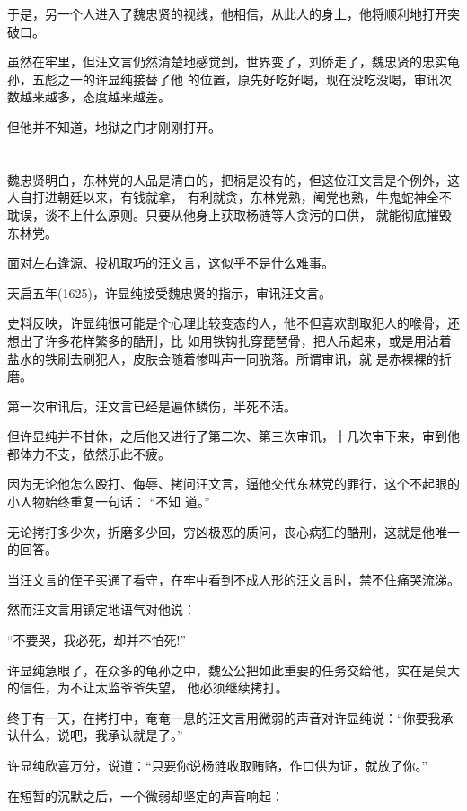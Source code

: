 \documentclass[11pt,a4paper,onecolumn]{article}
\begin{document}
于是，另一个人进入了魏忠贤的视线，他相信，从此人的身上，他将顺利地打开突破口。

虽然在牢里，但汪文言仍然清楚地感觉到，世界变了，刘侨走了，魏忠贤的忠实龟孙，五彪之一的许显纯接替了他
的位置，原先好吃好喝，现在没吃没喝，审讯次数越来越多，态度越来越差。

但他并不知道，地狱之门才刚刚打开。

\section[\thesection]{}

魏忠贤明白，东林党的人品是清白的，把柄是没有的，但这位汪文言是个例外，这人自打进朝廷以来，有钱就拿，
有利就贪，东林党熟，阉党也熟，牛鬼蛇神全不耽误，谈不上什么原则。只要从他身上获取杨涟等人贪污的口供，
就能彻底摧毁东林党。

面对左右逢源、投机取巧的汪文言，这似乎不是什么难事。

天启五年(1625)，许显纯接受魏忠贤的指示，审讯汪文言。

史料反映，许显纯很可能是个心理比较变态的人，他不但喜欢割取犯人的喉骨，还想出了许多花样繁多的酷刑，比
如用铁钩扎穿琵琶骨，把人吊起来，或是用沾着盐水的铁刷去刷犯人，皮肤会随着惨叫声一同脱落。所谓审讯，就
是赤裸裸的折磨。

第一次审讯后，汪文言已经是遍体鳞伤，半死不活。

但许显纯并不甘休，之后他又进行了第二次、第三次审讯，十几次审下来，审到他都体力不支，依然乐此不疲。

因为无论他怎么殴打、侮辱、拷问汪文言，逼他交代东林党的罪行，这个不起眼的小人物始终重复一句话： ``不知
道。''

无论拷打多少次，折磨多少回，穷凶极恶的质问，丧心病狂的酷刑，这就是他唯一的回答。

当汪文言的侄子买通了看守，在牢中看到不成人形的汪文言时，禁不住痛哭流涕。

然而汪文言用镇定地语气对他说：

``不要哭，我必死，却并不怕死!''

许显纯急眼了，在众多的龟孙之中，魏公公把如此重要的任务交给他，实在是莫大的信任，为不让太监爷爷失望，
他必须继续拷打。

终于有一天，在拷打中，奄奄一息的汪文言用微弱的声音对许显纯说：``你要我承认什么，说吧，我承认就是了。''

许显纯欣喜万分，说道：``只要你说杨涟收取贿赂，作口供为证，就放了你。''

在短暂的沉默之后，一个微弱却坚定的声音响起：
\end{document}
